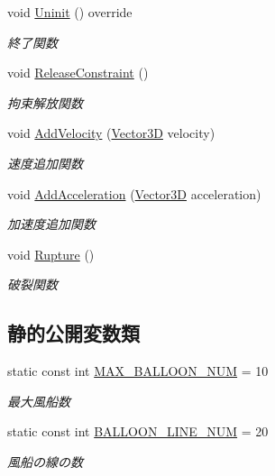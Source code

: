 \begin{DoxyCompactItemize}
void \mbox{\hyperlink{class_balloon_group_a12ade72ec1cbb2a1afe431c471bbc255}{Uninit}} () override
\begin{DoxyCompactList}\small\item\em 終了関数 \end{DoxyCompactList}\item 
void \mbox{\hyperlink{class_balloon_group_abb663d61b35feebaf1997644138df64b}{Release\+Constraint}} ()
\begin{DoxyCompactList}\small\item\em 拘束解放関数 \end{DoxyCompactList}\item 
void \mbox{\hyperlink{class_balloon_group_addb01a96ff7f31b693d8f39757840234}{Add\+Velocity}} (\mbox{\hyperlink{class_vector3_d}{Vector3D}} velocity)
\begin{DoxyCompactList}\small\item\em 速度追加関数 \end{DoxyCompactList}\item 
void \mbox{\hyperlink{class_balloon_group_ab2c00147bfd4c7776f2babc5d6568738}{Add\+Acceleration}} (\mbox{\hyperlink{class_vector3_d}{Vector3D}} acceleration)
\begin{DoxyCompactList}\small\item\em 加速度追加関数 \end{DoxyCompactList}\item 
void \mbox{\hyperlink{class_balloon_group_a6c7ee1166595e8809a06ccfeb49b8371}{Rupture}} ()
\begin{DoxyCompactList}\small\item\em 破裂関数 \end{DoxyCompactList}\end{DoxyCompactItemize}
\subsection*{静的公開変数類}
\begin{DoxyCompactItemize}
\item 
static const int \mbox{\hyperlink{class_balloon_group_abc53b845e436f62dc4f5899b83d1b029}{M\+A\+X\+\_\+\+B\+A\+L\+L\+O\+O\+N\+\_\+\+N\+UM}} = 10
\begin{DoxyCompactList}\small\item\em 最大風船数 \end{DoxyCompactList}\item 
static const int \mbox{\hyperlink{class_balloon_group_a1ff5315ab1a2d7706399cdd8db1f1a70}{B\+A\+L\+L\+O\+O\+N\+\_\+\+L\+I\+N\+E\+\_\+\+N\+UM}} = 20
\begin{DoxyCompactList}\small\item\em 風船の線の数 \end{DoxyCompactList}\end{DoxyCompactItemize}

